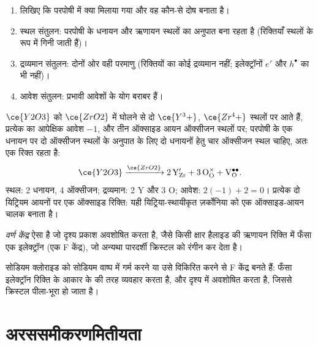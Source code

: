 \begin{method}[दोष समीकरण लिखना]\label{met:b3:solid-state:kroger-vink}
\begin{enumerate}
  \item लिखिए कि परपोषी में क्या मिलाया गया और वह कौन-से दोष बनाता है।
  \item स्थल संतुलन: परपोषी के धनायन और ऋणायन स्थलों का अनुपात बना रहता है
        (रिक्तियाँ स्थलों के रूप में गिनी जाती हैं)।
  \item द्रव्यमान संतुलन: दोनों ओर वही परमाणु (रिक्तियों का कोई द्रव्यमान नहीं;
        इलेक्ट्रॉनों $e'$ और  $h^\bullet$ का भी नहीं)।
  \item आवेश संतुलन: प्रभावी आवेशों के योग बराबर हैं।
\end{enumerate}
\end{method}

\begin{example}[ज़र्कोनिया में यिट्रिया]
$\ce{Y2O3}$ को $\ce{ZrO2}$ में घोलने से दो $\ce{Y^3+}$, $\ce{Zr^4+}$ स्थलों पर आते हैं, प्रत्येक का आपेक्षिक आवेश $-1$, और
तीन ऑक्साइड आयन ऑक्सीजन स्थलों पर; परपोषी के एक धनायन पर दो ऑक्सीजन
स्थलों के अनुपात के लिए दो धनायनों हेतु चार ऑक्सीजन स्थल चाहिए, अतः एक रिक्त रहता है:
\[
  \ce{Y2O3} \xrightarrow{\ce{ZrO2}} \mathrm{2\,Y_{Zr}' + 3\,O_O^{\times} + V_O^{\bullet\bullet}}.
\]
स्थल: 2 धनायन, 4 ऑक्सीजन; द्रव्यमान: 2 Y और 3 O; आवेश: $2(-1) + 2 = 0$। प्रत्येक दो
यिट्रियम आयनों पर एक ऑक्साइड रिक्ति: यही यिट्रिया-स्थायीकृत ज़र्कोनिया को
एक ऑक्साइड-आयन चालक बनाता है।
\end{example}

\begin{definition}[वर्ण केंद्र]\label{def:b3:solid-state:colour-centre}
\emph{वर्ण केंद्र} ऐसा  है जो
दृश्य प्रकाश अवशोषित करता है, जैसे किसी क्षार हैलाइड की ऋणायन रिक्ति में फँसा एक इलेक्ट्रॉन
(एक F केंद्र), जो अन्यथा पारदर्शी क्रिस्टल को रंगीन कर देता है।
\end{definition}

सोडियम क्लोराइड को सोडियम वाष्प में गर्म करने या उसे विकिरित करने से F केंद्र बनते हैं:
फँसा इलेक्ट्रॉन रिक्ति के आकार के  की तरह व्यवहार करता है, और
दृश्य में अवशोषित करता है, जिससे क्रिस्टल पीला-भूरा हो जाता है।

\section{अरससमीकरणमितीयता}

